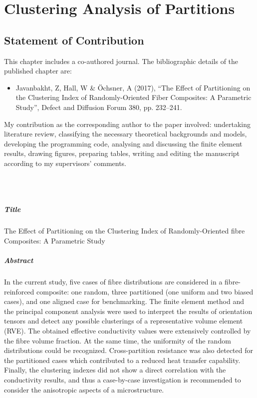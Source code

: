 \chapter{Clustering Analysis of Partitions}\label{chap:p4}

\section*{Statement of Contribution}
	This chapter includes a co-authored journal. The bibliographic details of the published chapter are:
\begin{itemize}
	\item Javanbakht, Z, Hall, W \& Öchsner, A (2017), “The Effect of Partitioning on the Clustering Index of Randomly-Oriented Fiber Composites: A Parametric Study”, Defect and Diffusion Forum 380, pp. 232–241.
\end{itemize}
	My contribution as the corresponding author to the paper involved: undertaking literature review, classifying the necessary theoretical backgrounds and models, developing the programming code, analysing and discussing the finite element results, drawing figures, preparing tables, writing and editing the manuscript according to my supervisors’ comments.

\Zia\\
\Wayne\\
\vfill
\newpage


\paragraph{Title} The Effect of Partitioning on the Clustering Index of Randomly-Oriented fibre Composites: A Parametric Study

\paragraph{Abstract} In the current study, five cases of fibre distributions are considered in a fibre-reinforced composite: one random, three partitioned (one uniform and two biased cases), and one aligned case for benchmarking. The finite element method and the principal component analysis were used to interpret the results of orientation tensors and detect any possible clusterings of a representative volume element (RVE). The obtained effective conductivity values were extensively controlled by the fibre volume fraction. At the same time, the uniformity of the random distributions could be recognized. Cross-partition resistance was also detected for the partitioned cases which contributed to a reduced heat transfer capability. Finally, the clustering indexes did not show a direct correlation with the conductivity results, and thus a case-by-case investigation is recommended to consider the anisotropic aspects of a microstructure.

